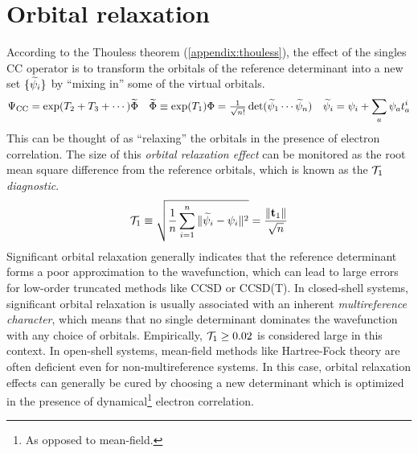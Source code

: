 \documentclass[11pt]{article}
\numberwithin{equation}{section}
\begin{document}
\setlength{\abovedisplayskip}{5pt}
\setlength{\belowdisplayskip}{5pt}


\setcounter{section}{7}
\section{Orbital relaxation}


\begin{rmk}
According to the Thouless theorem (\cref{appendix:thouless}), the effect of the singles CC operator is to transform the orbitals of the reference determinant into a new set $\{\widetilde{\psi }_i\}$ by ``mixing in'' some of the virtual orbitals.
\begin{align}
  \Psi _{\mathrm{CC}}
=
  \mathrm{exp}(T_2 + T_3 + \cdots)
  \widetilde{\Phi }
&&
  \widetilde{\Phi }
\equiv
  \mathrm{exp}(T_1)
  \Phi 
=
  \tfrac{1}{\sqrt{n!}}\,
  \mathrm{det}(\widetilde{\psi }_1\cdots \widetilde{\psi }_n)
&&
  \widetilde{\psi }_i
=
  \psi _i
+
  \sum_a
  \psi _a
  t_a^i
\end{align}
This can be thought of as ``relaxing'' the orbitals in the presence of electron correlation.
The size of this \textit{orbital relaxation effect} can be monitored as the root mean square difference from the reference orbitals, which is known as the \textit{$\mathcal{T}_1$ diagnostic}.
\begin{align}
  \mathcal{T}_1
\equiv
  \sqrt{
  \frac {1}{n}
  \sum_{i=1}^n
  \|\widetilde{\psi }_i - \psi _i\|^2
  }
=
  \frac {\|\mathbf{t}_1\|}{\sqrt{n}}
\end{align}
Significant orbital relaxation generally indicates that the reference determinant forms a poor approximation to the wavefunction, which can lead to large errors for low-order truncated methods like CCSD or CCSD(T).
In closed-shell systems, significant orbital relaxation is usually associated with an inherent \textit{multireference character}, which means that no single determinant dominates the wavefunction with any choice of orbitals.
Empirically, $\mathcal{T}_1\geq 0.02$ is considered large in this context.
In open-shell systems, mean-field methods like Hartree-Fock theory are often deficient even for non-multireference systems.
In this case, orbital relaxation effects can generally be cured by choosing a new determinant which is optimized in the presence of dynamical\footnote{As opposed to mean-field.} electron correlation.
\end{rmk}
\end{document}
